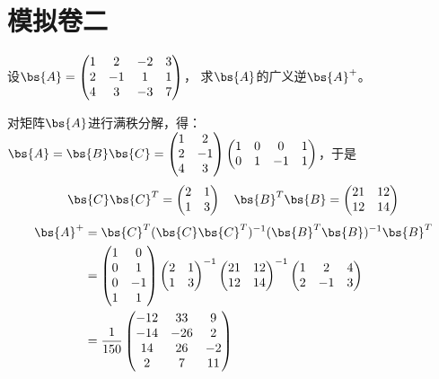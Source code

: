 \documentclass[12pt, a4paper, oneside, UTF8]{ctexbook}
\begin{document}
\else
\fi

\chapter{模拟卷二}
\begin{question} 
   设$\bs{A}=\begin{pmatrix}
    1&2&-2&3\\
    2&-1&1&1\\
    4&3&-3&7
   \end{pmatrix}$，
   求$\bs{A}$的广义逆$\bs{A}^+$。
\end{question}

\begin{solution}
    对矩阵$\bs{A}$进行满秩分解，得：
    $\bs{A}=\bs{B}\bs{C}=\begin{pmatrix}
        1 & 2\\
        2&-1\\
        4&3
    \end{pmatrix}\begin{pmatrix}
        1&0&0&1\\
        0&1&-1&1
    \end{pmatrix}$，于是
    \begin{align*}
        \bs{C}\bs{C}^T=\begin{pmatrix}
            2&1\\
            1&3
        \end{pmatrix} \quad \bs{B}^T\bs{B}=\begin{pmatrix}
            21&12\\
            12&14
        \end{pmatrix}
    \end{align*}
    \begin{align*}
        \bs{A}^+&=
    \bs{C}^T(\bs{C}\bs{C}^T)^{-1}(\bs{B}^T\bs{B})^{-1}\bs{B}^T\\
    &=\begin{pmatrix}
        1 & 0\\
        0&1\\
        0&-1\\
        1&1
    \end{pmatrix}\begin{pmatrix}
        2&1\\
        1&3
    \end{pmatrix}^{-1}\begin{pmatrix}
        21&12\\
        12&14
    \end{pmatrix}^{-1}
    \begin{pmatrix}
        1&2&4\\
        2&-1&3
    \end{pmatrix}\\
    &=\frac{1}{150}\begin{pmatrix}
       -12&33&9\\
       -14&-26&2\\
       14&26&-2\\
       2&7&11
    \end{pmatrix}
    \end{align*}
\end{solution}
\end{document}
